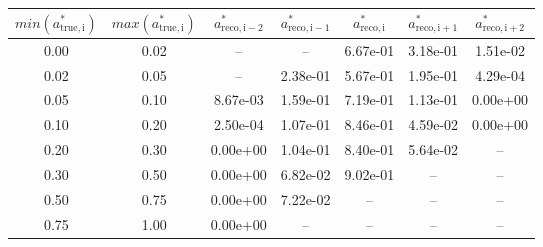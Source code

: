 \begin{tabular}{|cc||ccccc|} \hline 
$min(a^{*}_\mathrm{true,i})$ & $max(a^{*}_\mathrm{true,i})$ & $a^{*}_\mathrm{reco,i-2}$ & $a^{*}_\mathrm{reco,i-1}$ & $a^{*}_\mathrm{reco,i}$ & $a^{*}_\mathrm{reco,i+1}$ & $a^{*}_\mathrm{reco,i+2}$ \\ \hline 
 0.00 &  0.02 &  --  &  --  & 6.67e-01 & 3.18e-01 & 1.51e-02\\
 0.02 &  0.05 &  --  & 2.38e-01 & 5.67e-01 & 1.95e-01 & 4.29e-04\\
 0.05 &  0.10 & 8.67e-03 & 1.59e-01 & 7.19e-01 & 1.13e-01 & 0.00e+00\\
 0.10 &  0.20 & 2.50e-04 & 1.07e-01 & 8.46e-01 & 4.59e-02 & 0.00e+00\\
 0.20 &  0.30 & 0.00e+00 & 1.04e-01 & 8.40e-01 & 5.64e-02 &  -- \\
 0.30 &  0.50 & 0.00e+00 & 6.82e-02 & 9.02e-01 &  --  &  -- \\
 0.50 &  0.75 & 0.00e+00 & 7.22e-02 &  --  &  --  &  -- \\
 0.75 &  1.00 & 0.00e+00 &  --  &  --  &  --  &  -- \\
\hline
\end{tabular}
